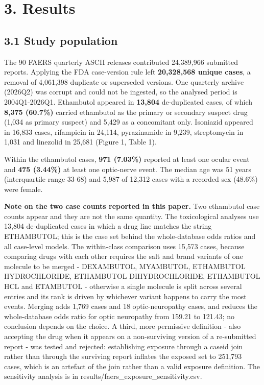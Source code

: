 \documentclass[utf8]{FrontiersinVancouver}
\begin{document}
\section{3. Results}

\subsection{3.1 Study population}

The 90 FAERS quarterly ASCII releases contributed 24,389,966 submitted reports. Applying the FDA case-version rule left \textbf{20,328,568 unique cases}, a removal of 4,061,398 duplicate or superseded versions. One quarterly archive (2026Q2) was corrupt and could not be ingested, so the analysed period is 2004Q1-2026Q1. Ethambutol appeared in \textbf{13,804} de-duplicated cases, of which \textbf{8,375 (60.7\%)} carried ethambutol as the primary or secondary suspect drug (1,034 as primary suspect) and 5,429 as a concomitant only. Isoniazid appeared in 16,833 cases, rifampicin in 24,114, pyrazinamide in 9,239, streptomycin in 1,031 and linezolid in 25,681 (Figure 1, Table 1).

Within the ethambutol cases, \textbf{971 (7.03\%)} reported at least one ocular event and \textbf{475 (3.44\%)} at least one optic-nerve event. The median age was 51 years (interquartile range 33-68) and 5,987 of 12,312 cases with a recorded sex (48.6\%) were female.

\textbf{Note on the two case counts reported in this paper.} Two ethambutol case counts appear and they are not the same quantity. The toxicological analyses use 13,804 de-duplicated cases in which a drug line matches the string ETHAMBUTOL; this is the case set behind the whole-database odds ratios and all case-level models. The within-class comparison uses 15,573 cases, because comparing drugs with each other requires the salt and brand variants of one molecule to be merged - DEXAMBUTOL, MYAMBUTOL, ETHAMBUTOL HYDROCHLORIDE, ETHAMBUTOL DIHYDROCHLORIDE, ETHAMBUTOL HCL and ETAMBUTOL - otherwise a single molecule is split across several entries and its rank is driven by whichever variant happens to carry the most events. Merging adds 1,769 cases and 18 optic-neuropathy cases, and reduces the whole-database odds ratio for optic neuropathy from 159.21 to 121.43; no conclusion depends on the choice. A third, more permissive definition - also accepting the drug when it appears on a non-surviving version of a re-submitted report - was tested and rejected: establishing exposure through a caseid join rather than through the surviving report inflates the exposed set to 251,793 cases, which is an artefact of the join rather than a valid exposure definition. The sensitivity analysis is in results/faers\_exposure\_sensitivity.csv.
\end{document}
